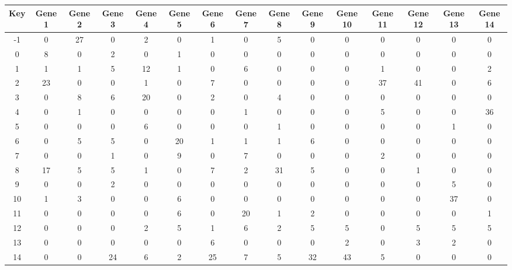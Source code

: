 \begin{tabular}{|c|c|c|c|c|c|c|c|c|c|c|c|c|c|c|}
\hline
Key & Gene 1 & Gene 2 & Gene 3 & Gene 4 & Gene 5 & Gene 6 & Gene 7 & Gene 8 & Gene 9 & Gene 10 & Gene 11 & Gene 12 & Gene 13 & Gene 14 \\
\hline
-1 & 0 & 27 & 0 & 2 & 0 & 1 & 0 & 5 & 0 & 0 & 0 & 0 & 0 & 0 \\
0 & 8 & 0 & 2 & 0 & 1 & 0 & 0 & 0 & 0 & 0 & 0 & 0 & 0 & 0 \\
1 & 1 & 1 & 5 & 12 & 1 & 0 & 6 & 0 & 0 & 0 & 1 & 0 & 0 & 2 \\
2 & 23 & 0 & 0 & 1 & 0 & 7 & 0 & 0 & 0 & 0 & 37 & 41 & 0 & 6 \\
3 & 0 & 8 & 6 & 20 & 0 & 2 & 0 & 4 & 0 & 0 & 0 & 0 & 0 & 0 \\
4 & 0 & 1 & 0 & 0 & 0 & 0 & 1 & 0 & 0 & 0 & 5 & 0 & 0 & 36 \\
5 & 0 & 0 & 0 & 6 & 0 & 0 & 0 & 1 & 0 & 0 & 0 & 0 & 1 & 0 \\
6 & 0 & 5 & 5 & 0 & 20 & 1 & 1 & 1 & 6 & 0 & 0 & 0 & 0 & 0 \\
7 & 0 & 0 & 1 & 0 & 9 & 0 & 7 & 0 & 0 & 0 & 2 & 0 & 0 & 0 \\
8 & 17 & 5 & 5 & 1 & 0 & 7 & 2 & 31 & 5 & 0 & 0 & 1 & 0 & 0 \\
9 & 0 & 0 & 2 & 0 & 0 & 0 & 0 & 0 & 0 & 0 & 0 & 0 & 5 & 0 \\
10 & 1 & 3 & 0 & 0 & 6 & 0 & 0 & 0 & 0 & 0 & 0 & 0 & 37 & 0 \\
11 & 0 & 0 & 0 & 0 & 6 & 0 & 20 & 1 & 2 & 0 & 0 & 0 & 0 & 1 \\
12 & 0 & 0 & 0 & 2 & 5 & 1 & 6 & 2 & 5 & 5 & 0 & 5 & 5 & 5 \\
13 & 0 & 0 & 0 & 0 & 0 & 6 & 0 & 0 & 0 & 2 & 0 & 3 & 2 & 0 \\
14 & 0 & 0 & 24 & 6 & 2 & 25 & 7 & 5 & 32 & 43 & 5 & 0 & 0 & 0 \\
\hline
\end{tabular}